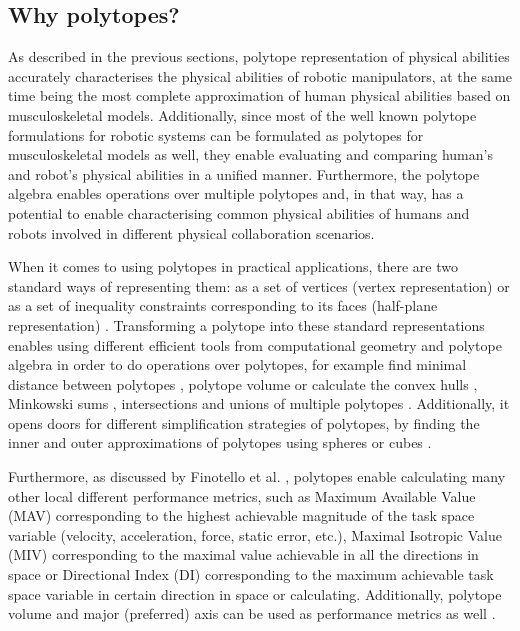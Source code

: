 \subsection{Why polytopes?}

As described in the previous sections, polytope representation of physical abilities accurately 
characterises the physical abilities of robotic manipulators, at the same time being the most complete approximation of human physical abilities based on musculoskeletal models. Additionally, since most of the well known polytope formulations for robotic systems can be formulated as polytopes for musculoskeletal models as well, they enable evaluating and comparing human's and robot's physical abilities in a unified manner. Furthermore, the polytope algebra enables operations over multiple polytopes and, in that way, has a potential to enable characterising common physical abilities of humans and robots involved in different physical collaboration scenarios. 

When it comes to using polytopes in practical applications, there are two standard ways of representing them: as a set of vertices (vertex representation) or as a set of inequality constraints corresponding to its faces (half-plane representation) \cite{fukuda2004frequently}. Transforming a polytope into these standard representations enables using different efficient tools from computational geometry and polytope algebra in order to do operations over polytopes, for example find minimal distance between polytopes \cite{Ong1997gjk}, polytope volume \cite{Lawrence1991Volume} or calculate the convex hulls \cite{Barber1996}, Minkowski sums \cite{BARKI2009525}, intersections and unions of multiple polytopes \cite{Tiwary2008}. Additionally, it opens doors for different simplification strategies of polytopes, by finding the inner and outer approximations of polytopes using spheres \cite{Botkin1994} or cubes \cite{BEMPORAD2004151}.

Furthermore, as discussed by Finotello et al. \cite{Finotello1998}, polytopes enable calculating many other local different performance metrics, such as Maximum Available Value (MAV) corresponding to the highest achievable magnitude of the task space variable (velocity, acceleration, force, static error, etc.), Maximal Isotropic Value (MIV) corresponding to the maximal value achievable in all the directions in space or Directional Index (DI) \cite{boschetti_minto_2023} corresponding to the maximum achievable task space variable in certain direction in space or calculating. Additionally, polytope volume and major (preferred) axis can be used as performance metrics as well \cite{chiacchio_global_1991, Long2018Evaluating}.

